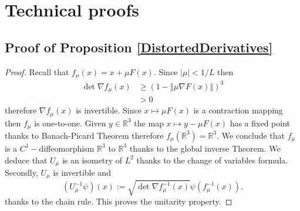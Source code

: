 \documentclass[a4paper, 12pt]{amsart}
\numberwithin{equation}{section}
\newcommand{\R}{\mathbb{R}} %
\newcommand{\lp}{\left(} %
\newcommand{\rp}{\right)} %
\newcommand{\lv}{\left\vert} %
\newcommand{\rv}{\right\vert} %
\newcommand{\lV}{\left\Vert} %
\newcommand{\rV}{\right\Vert} %
\begin{document}
\section{Technical proofs}\label{Appendix}

\subsection{Proof of Proposition \ref{DistortedDerivatives}}

\begin{proof}
    Recall that $f_\mu(x)=x+\mu F(x)$. Since $\lv\mu\rv<1/L$ then
    \begin{align*}
        \det\nabla f_\mu(x)&\geq\lp1-\lV\mu \nabla F(x)\rV\rp^3\\
        &>0
    \end{align*}
    therefore $\nabla f_\mu(x)$ is invertible. Since $ x\mapsto\mu F(x)$ is a contraction mapping then $ f_\mu$ is one-to-one. Given $y\in\R^3$ the map $ x\mapsto y-\mu F(x)$ has a fixed point thanks to Banach-Picard Theorem therefore $ f_\mu(\R^3)=\R^3$. We conclude that $ f_\mu$ is a $ C^1-$diffeomorphism $\R^3$ to $\R^3$ thanks to the global inverse Theorem. We deduce that $U_\mu$ is an isometry of $ L^2$ thanks to the change of variables formula. Secondly, $U_\mu$ is invertible and 
    \[(U_\mu^{-1}\psi)(x):=\sqrt{\det \nabla f_\mu^{-1}(x)}\psi(f_\mu^{-1}(x)).\]
    thanks to the chain rule. This proves the unitarity property.
    

\end{proof}
\end{document}
